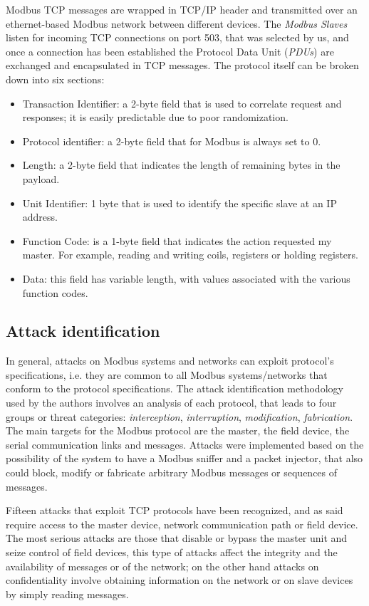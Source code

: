 \documentclass[12pt]{article}
\begin{document}
Modbus TCP messages are wrapped in TCP/IP header and transmitted over an ethernet-based Modbus network 
between different devices. The \textit{Modbus Slaves} listen for incoming TCP connections on port 503, 
that was selected by us, and once a connection has been established the Protocol Data Unit (\textit{PDUs}) 
are exchanged and encapsulated in TCP messages. The protocol itself can be broken down into six sections: 
\begin{itemize}
    \item Transaction Identifier: a 2-byte field that is used to correlate request and responses; it is easily predictable due to poor randomization.
    \item Protocol identifier: a 2-byte field that for Modbus is always set to 0.
    \item Length: a 2-byte field that indicates the length of remaining bytes in the payload.
    \item Unit Identifier: 1 byte that is used to identify the specific slave at an IP address.
    \item Function Code: is a 1-byte field that indicates the action requested my master. For example, reading and writing coils, registers or holding registers.
    \item Data: this field has variable length, with values associated with the various function codes. 
\end{itemize}

\subsection{Attack identification}
In general, attacks on Modbus systems and networks can exploit protocol's specifications, i.e. they are common to all Modbus systems/networks that 
conform to the protocol specifications. The attack identification methodology used by the authors \cite{huitsing2008attack} involves an analysis of each protocol, that leads to four groups or threat categories: \textit{interception}, \textit{interruption}, \textit{modification}, \textit{fabrication}.
The main targets for the Modbus protocol are the master, the field device, the serial communication links and messages. Attacks were implemented based on the possibility of the system to have a Modbus sniffer and a packet injector, that also could block, modify or fabricate arbitrary Modbus messages or sequences of messages. 

Fifteen attacks that exploit TCP protocols have been recognized, and as said require access to the master device, network communication path or field device.
The most serious attacks are those that disable or bypass the master unit and seize control of field devices, this type of attacks affect the integrity and the availability of
messages or of the network; on the other hand attacks on confidentiality involve obtaining information on the network or on slave devices by simply reading messages.
\end{document}
